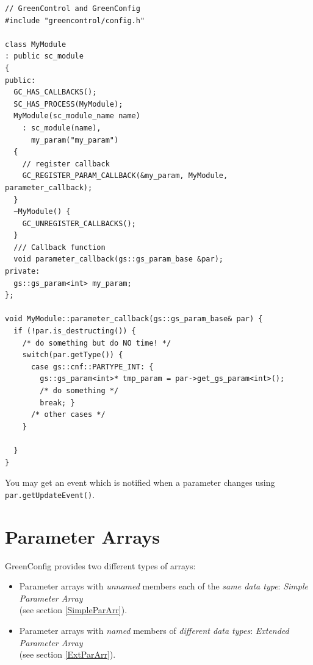 \begin{minipage}{\textwidth}

\begin{lstlisting}
// GreenControl and GreenConfig
#include "greencontrol/config.h"

class MyModule
: public sc_module
{
public:
  GC_HAS_CALLBACKS();
  SC_HAS_PROCESS(MyModule);
  MyModule(sc_module_name name)
    : sc_module(name),
      my_param("my_param")
  {
    // register callback
    GC_REGISTER_PARAM_CALLBACK(&my_param, MyModule, parameter_callback);
  }
  ~MyModule() {
    GC_UNREGISTER_CALLBACKS();
  }
  /// Callback function
  void parameter_callback(gs::gs_param_base &par);
private:
  gs::gs_param<int> my_param;
};

void MyModule::parameter_callback(gs::gs_param_base& par) {
  if (!par.is_destructing()) {
    /* do something but do NO time! */
    switch(par.getType()) {
      case gs::cnf::PARTYPE_INT: {
        gs::gs_param<int>* tmp_param = par->get_gs_param<int>();
        /* do something */
        break; }
      /* other cases */
    }

  } 
}
\end{lstlisting}
\end{minipage}


 \newline 
You may get an event which is notified when a parameter changes using \lstinline|par.getUpdateEvent()|. \\




\newpage
\section{Parameter Arrays}
\label{ParameterArrays}

GreenConfig provides two different types of arrays:
\begin{itemize}
    \item Parameter arrays with \textsl{unnamed} members each of the \textsl{same data type}: {\em Simple Parameter Array}\\
     (see section \ref{SimpleParArr}).
    \item Parameter arrays with \textsl{named} members of \textsl{different data types}: {\em Extended Parameter Array} \\
    (see section \ref{ExtParArr}).
\end{itemize}

